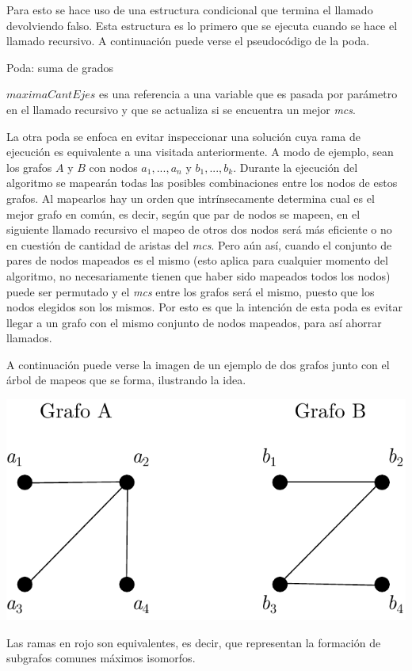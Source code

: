 Para esto se hace uso de una estructura condicional que termina el llamado
devolviendo falso. Esta estructura es lo primero que se ejecuta cuando se hace
el llamado recursivo. A continuación puede verse el pseudocódigo de la poda.

\begin{algorithm}
    \caption{Poda: suma de grados}
     {
    }
\end{algorithm}

$maximaCantEjes$ es una referencia a una variable que es pasada por parámetro
en el llamado recursivo y que se actualiza si se encuentra un mejor
\textit{mcs}.

La otra poda se enfoca en evitar inspeccionar una solución cuya rama de
ejecución es equivalente a una visitada anteriormente. A modo de ejemplo, sean
los grafos $A$ y $B$ con nodos $a_1, ..., a_n$ y $b_1, ..., b_k$. Durante la
ejecución del algoritmo se mapearán todas las posibles combinaciones entre
los nodos de estos grafos. Al mapearlos hay un orden que intrínsecamente
determina cual es el mejor grafo en común, es decir, según que par de nodos
se mapeen, en el siguiente llamado recursivo el mapeo de otros dos nodos
será más eficiente o no en cuestión de cantidad de aristas del \textit{mcs}.
Pero aún así, cuando el conjunto de pares de nodos mapeados es el mismo (esto
aplica para cualquier momento del algoritmo, no necesariamente tienen que
haber sido mapeados todos los nodos) puede ser permutado y el \textit{mcs}
entre los grafos será el mismo, puesto que los nodos elegidos son los mismos.
Por esto es que la intención de esta poda es evitar llegar a un grafo con el
mismo conjunto de nodos mapeados, para así ahorrar llamados.

A continuación puede verse la imagen de un ejemplo de dos grafos junto con el
árbol de mapeos que se forma, ilustrando la idea.

\begin{center}
\includegraphics[width=.45\textwidth]{imagenes/ex2_grafos.pdf}
\end{center}

Las ramas en rojo son equivalentes, es decir, que representan la formación de
subgrafos comunes máximos isomorfos.

